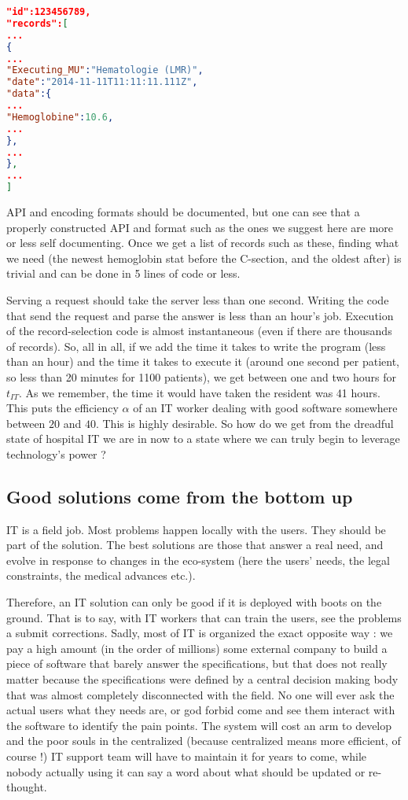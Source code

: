 \documentclass[nobib]{tufte-handout}
\begin{document}
\begin{lstlisting}[language=json,firstnumber=1]
"id":123456789,
"records":[
...
{
...
"Executing_MU":"Hematologie (LMR)",
"date":"2014-11-11T11:11:11.111Z",
"data":{
...
"Hemoglobine":10.6,
...
},
...
},
...
]
\end{lstlisting}

API and encoding formats should be documented, but one can see that a properly constructed API and format such as the ones we suggest here are more or less self documenting. Once we get a list of records such as these, finding what we need (the newest hemoglobin stat before the C-section, and the oldest after) is trivial and can be done in 5 lines of code or less.

Serving a request should take the server less than one second. Writing the code that send the request and parse the answer is less than an hour's job. Execution of the record-selection code is almost instantaneous (even if there are thousands of records). So, all in all, if we add the time it takes to write the program (less than an hour) and the time it takes to execute it (around one second per patient, so less than 20 minutes for 1100 patients), we get between one and two hours for $t_{IT}$. As we remember, the time it would have taken the resident was 41 hours. This puts the efficiency $\alpha$ of an IT worker dealing with good software somewhere between $20$ and $40$. This is highly desirable. So how do we get from the dreadful state of hospital IT we are in now to a state where we can truly begin to leverage technology's power ?

\subsection{Good solutions come from the bottom up}
\label{sec:good}

IT is a field job. Most problems happen locally with the users. They should be part of the solution. The best solutions are those that answer a real need, and evolve in response to changes in the eco-system (here the users' needs, the legal constraints, the medical advances etc.).

Therefore, an IT solution can only be good if it is deployed with boots on the ground. That is to say, with IT workers that can train the users, see the problems a submit corrections. Sadly, most of IT is organized the exact opposite way : we pay a high amount (in the order of millions) some external company to build a piece of software that barely answer the specifications, but that does not really matter because the specifications were defined by a central decision making body that was almost completely disconnected with the field. No one will ever ask the actual users what they needs are, or god forbid come and see them interact with the software to identify the pain points. The system will cost an arm to develop and the poor souls in the centralized (because centralized means more efficient, of course !) IT support team will have to maintain it for years to come, while nobody actually using it can say a word about what should be updated or re-thought.
\end{document}
